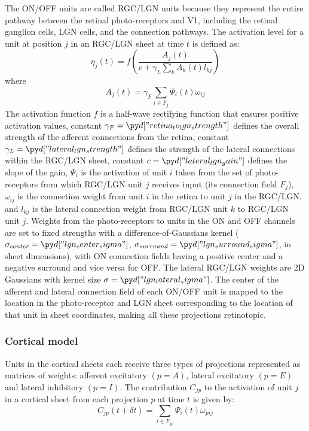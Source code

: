 \documentclass[utf8]{frontiersSCNS}
\begin{document}
The ON/OFF units are called RGC/LGN units because they represent the entire pathway between the retinal photo-receptors
and V1, including the retinal ganglion cells, LGN cells, and the connection pathways. The activation level for a unit at position $j$
in an RGC/LGN sheet at time $t$ is defined as:
\begin{equation}
\eta_{j}(t)=f\left(\frac{A_{j}(t)}{c + \gamma_{L}\sum_{k}A_{k}(t)l_{kj}}\right)
\end{equation}
\noindent where
\begin{equation}
A_{j}(t) = \gamma_{F}\sum_{i\in F_j}\Psi_{i}(t)\omega_{ij}
\end{equation}
The activation function $f$ is a half-wave rectifying function that ensures positive activation values, constant $\gamma_{F}=\insval{retina_to_lgn_strength}$ defines the overall strength of the afferent connections from the retina, constant $\gamma_{L}=\insval{lateral_lgn_strength}$ defines the strength of the lateral connections within the RGC/LGN sheet, constant $c=\insval{lateral_lgn_gain}$ defines the slope of the gain, $\Psi_{i}$ is the activation of unit $i$ taken from the set of photo-receptors
from which RGC/LGN unit $j$ receives input (its connection field $F_j$), $\omega_{ij}$ is the connection weight from unit $i$ in the
retina to unit $j$ in the RGC/LGN, and $l_{kj}$ is the lateral connection weight from RGC/LGN unit $k$ to RGC/LGN unit $j$.
Weights from the photo-receptors to units in the ON and OFF channels are set to fixed strengths with a difference-of-Gaussians
kernel ($\sigma_{center}=\insval{lgn_center_sigma}$, $\sigma_{surround}=\insval{lgn_surround_sigma}$, in sheet dimensions), with ON connection fields having a positive center and a negative surround and vice versa for OFF.  The lateral RGC/LGN weights are 2D Gaussians with kernel size $\sigma=\insval{lgn_lateral_sigma}$. The center of the afferent and lateral connection field of each ON/OFF unit is mapped to the location in the photo-receptor and LGN sheet corresponding to the location of that unit in sheet coordinates, making all these projections retinotopic.

\subsubsection{Cortical model}

Units in the cortical sheets each receive three types of projections represented as matrices of weights: afferent excitatory $(p=A)$, 
lateral excitatory $(p=E)$ and lateral inhibitory $(p=I)$.  The contribution $C_{jp}$ to the activation of unit $j$ in a cortical sheet from each projection $p$ at time $t$ is given by: 
\begin{equation} \label{eq:vm_model}
C_{jp}(t+\delta t)=\sum_{i\in F_{jp}}\Psi_{i}(t)\omega_{pij} 
\end{equation} 
\end{document}
